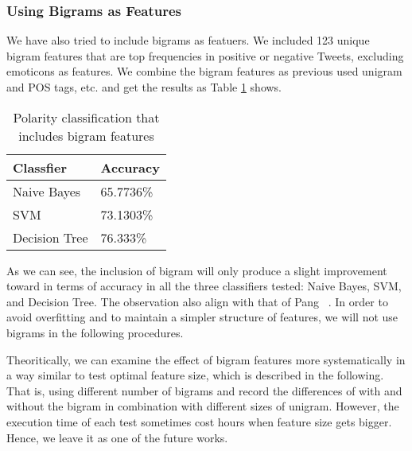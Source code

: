 \documentclass[12pt]{article}
\begin{document}

\subsubsection{Using Bigrams as Features}

We have also tried to include bigrams as featuers. We included 123 unique bigram features that are top frequencies in positive or negative Tweets, excluding emoticons as features. We combine the bigram features as previous used unigram and POS tags, etc. and get the results as Table \ref{bigrams-polarity} shows.

\begin{table}
\begin{center}
    \begin{tabular}{ | l || l | }
        \hline
        \textbf{Classfier} &  \textbf{Accuracy} \\ \hline
        \hline
        Naive Bayes &  65.7736\% \\ \hline
        SVM & 73.1303\% \\ \hline
        Decision Tree & 76.333\% \\ \hline
    \end{tabular}
\caption{Polarity classification that includes bigram features}
\label{bigrams-polarity}
\end{center}
\end{table}

As we can see, the inclusion of bigram will only produce a slight improvement toward in terms of accuracy in all the three classifiers tested: Naive Bayes, SVM, and Decision Tree. The observation also align with that of Pang \etal~\cite{Pang:02}. In order to avoid overfitting and to maintain a simpler structure of features, we will not use bigrams in the following procedures.

Theoritically, we can examine the effect of bigram features more systematically in a way similar to test optimal feature size, which is described in the following. That is, using different number of bigrams and record the differences of with and without the bigram in combination with different sizes of unigram. However, the execution time of each test sometimes cost hours when feature size gets bigger. Hence, we leave it as one of the future works.
\end{document}
